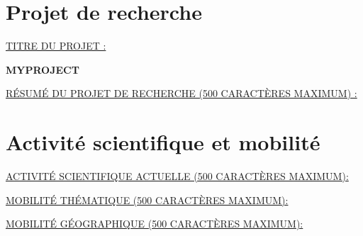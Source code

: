 \documentclass[a4paper,11pt]{article}
\newcommand{\anglaisFrancais}[2]{#2}
\newcommand{\anglaisFrancais}[2]{#1}
\newcommand{\projectTitleEN}{MYPROJECT}
\begin{document}
\section{\anglaisFrancais{Research project}{Projet de recherche}}

\noindent\underline{\MakeUppercase{\anglaisFrancais{Title of the research project}{Titre du projet :}}}

\bigskip

\textbf{%
\projectTitleEN{}
}


\bigskip
\bigskip

\noindent\underline{\MakeUppercase{\anglaisFrancais{Summary of the research project (maximum 500 characters):}{Résumé du projet de recherche (500 caractères maximum) :}}}

\bigskip





\section{\anglaisFrancais{Scientific activity and mobility}{Activité scientifique et mobilité}}

\noindent\underline{\MakeUppercase{\anglaisFrancais{Current scientific activity (maximum 500 characters):}{Activité scientifique actuelle (500 caractères maximum): }}}



\bigskip
\bigskip

\noindent\underline{\MakeUppercase{\anglaisFrancais{Mobility across thematic areas (maximum 500 characters):}{Mobilité thématique (500 caractères maximum): }}}

\bigskip



\bigskip
\bigskip

\noindent\underline{\MakeUppercase{\anglaisFrancais{Geographic mobility (maximum 500 characters):}{Mobilité géographique (500 caractères maximum): }}}
\end{document}
